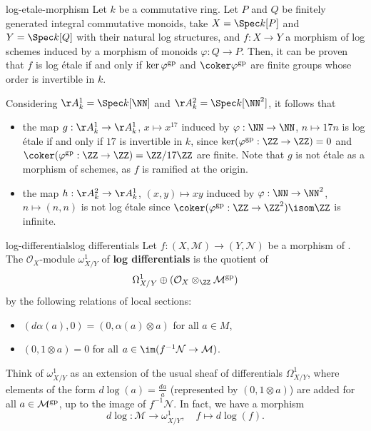 \begin{example}{log-etale-morphism}
    Let $k$ be a commutative ring. Let $P$ and $Q$ be finitely generated integral commutative monoids, take $X = \Spec k[P]$ and $Y = \Spec k[Q]$ with their natural log structures, and $f : X \to Y$ a morphism of log schemes induced by a morphism of monoids $\varphi : Q \to P$. Then, it can be proven that $f$ is log étale if and only if $\ker \varphi^\textup{gp}$ and $\coker \varphi^\textup{gp}$ are finite groups whose order is invertible in $k$.
    
    Considering $\AA^1_k = \Spec k[\NN]$ and $\AA^2_k = \Spec k[\NN^2]$, it follows that
    \begin{itemize}
        \item the map $g : \AA^1_k \to \AA^1_k$, $x \mapsto x^{17}$ induced by $\varphi : \NN \to \NN$, $n \mapsto 17n$ is log étale if and only if $17$ is invertible in $k$, since $\ker(\varphi^\textup{gp} : \ZZ \to \ZZ) = 0$ and $\coker(\varphi^\textup{gp} : \ZZ \to \ZZ) = \ZZ / 17 \ZZ$ are finite. Note that $g$ is not étale as a morphism of schemes, as $f$ is ramified at the origin.
        \item the map $h : \AA^2_k \to \AA^1_k$, $(x, y) \mapsto xy$ induced by $\varphi : \NN \to \NN^2$, $n \mapsto (n, n)$ is not log étale since $\coker(\varphi^\textup{gp} : \ZZ \to \ZZ^2) \isom \ZZ$ is infinite.
    \end{itemize}
\end{example}

\begin{topic}{log-differentials}{log differentials}
    Let $f : (X, \mathcal{M}) \to (Y, \mathcal{N})$ be a morphism of . The $\mathcal{O}_X$-module $\omega^1_{X/Y}$ of \textbf{log differentials} is the quotient of
    \[ \Omega_{X/Y}^1 \oplus (\mathcal{O}_X \otimes_\ZZ \mathcal{M}^\textup{gp}) \]
    by the following relations of local sections:
    \begin{itemize}
        \item $(d \alpha(a), 0) = (0, \alpha(a) \otimes a)$ for all $a \in M$,
        \item $(0, 1 \otimes a) = 0$ for all $a \in \im(f^{-1} \mathcal{N} \to \mathcal{M})$.
    \end{itemize}
    
    Think of $\omega^1_{X/Y}$ as an extension of the usual sheaf of differentials $\Omega_{X/Y}^1$, where elements of the form $d \log(a) = \frac{da}{a}$ (represented by $(0, 1 \otimes a)$) are added for all $a \in \mathcal{M}^\textup{gp}$, up to the image of $f^{-1} \mathcal{N}$. In fact, we have a morphism
    \[ d \log : \mathcal{M} \to \omega_{X/Y}^1, \quad f \mapsto d \log(f) . \]
\end{topic}

